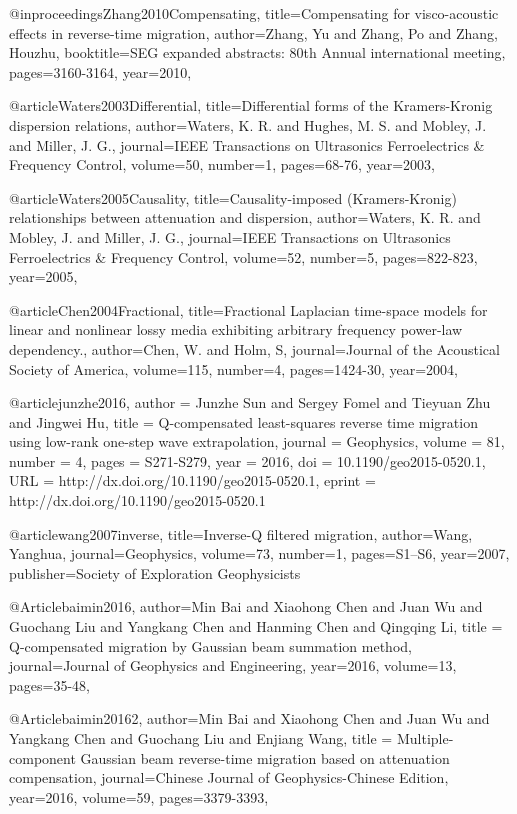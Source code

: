 {@inproceedings{Zhang2010Compensating,
  title={Compensating for visco-acoustic effects in reverse-time migration},
  author={Zhang, Yu and Zhang, Po and Zhang, Houzhu},
  booktitle={SEG expanded abstracts: 80th Annual international meeting},
  pages={3160-3164},
  year={2010},
}

@article{Waters2003Differential,
  title={Differential forms of the Kramers-Kronig dispersion relations},
  author={Waters, K. R. and Hughes, M. S. and Mobley, J. and Miller, J. G.},
  journal={IEEE Transactions on Ultrasonics Ferroelectrics \& Frequency Control},
  volume={50},
  number={1},
  pages={68-76},
  year={2003},
}

@article{Waters2005Causality,
  title={Causality-imposed (Kramers-Kronig) relationships between attenuation and dispersion},
  author={Waters, K. R. and Mobley, J. and Miller, J. G.},
  journal={IEEE Transactions on Ultrasonics Ferroelectrics \& Frequency Control},
  volume={52},
  number={5},
  pages={822-823},
  year={2005},
}

@article{Chen2004Fractional,
  title={Fractional Laplacian time-space models for linear and nonlinear lossy media exhibiting arbitrary frequency power-law dependency.},
  author={Chen, W. and Holm, S},
  journal={Journal of the Acoustical Society of America},
  volume={115},
  number={4},
  pages={1424-30},
  year={2004},
}

@article{junzhe2016,
author = {Junzhe Sun and Sergey Fomel and Tieyuan Zhu and Jingwei Hu},
title = {Q-compensated least-squares reverse time migration using low-rank one-step wave extrapolation},
journal = {Geophysics},
volume = {81},
number = {4},
pages = {S271-S279},
year = {2016},
doi = {10.1190/geo2015-0520.1},
URL = {http://dx.doi.org/10.1190/geo2015-0520.1},
eprint = {http://dx.doi.org/10.1190/geo2015-0520.1}
}

@article{wang2007inverse,
  title={Inverse-{Q} filtered migration},
  author={Wang, Yanghua},
  journal={Geophysics},
  volume={73},
  number={1},
  pages={S1--S6},
  year={2007},
  publisher={Society of Exploration Geophysicists}
}

@Article{baimin2016,
  author={Min Bai and Xiaohong Chen and Juan Wu and Guochang Liu and Yangkang Chen and Hanming Chen and Qingqing Li},
  title = {Q-compensated migration by Gaussian beam summation method},
  journal={Journal of Geophysics and Engineering},
  year=2016,
  volume=13,
  pages={35-48},
}

@Article{baimin20162,
  author={Min Bai and Xiaohong Chen and Juan Wu and Yangkang Chen and Guochang Liu and  Enjiang Wang},
  title = {Multiple-component Gaussian beam reverse-time migration based on attenuation compensation},
  journal={Chinese Journal of Geophysics-Chinese Edition},
  year=2016,
  volume=59,
  pages={3379-3393},
}

}

